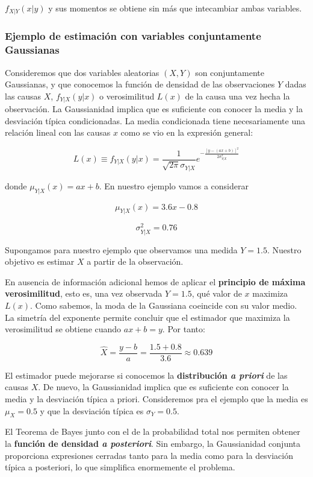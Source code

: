 \documentclass[11pt]{article}
\begin{document}
\(f_{X | Y}(x | y)\) y sus momentos se obtiene sin más que intecambiar
ambas variables.

    \hypertarget{ejemplo-de-estimaciuxf3n-con-variables-conjuntamente-gaussianas}{%
\subsubsection{Ejemplo de estimación con variables conjuntamente
Gaussianas}\label{ejemplo-de-estimaciuxf3n-con-variables-conjuntamente-gaussianas}}

Consideremos que dos variables aleatorias \((X, Y)\) son conjuntamente
Gaussianas, y que conocemos la función de densidad de las observaciones
\(Y\) dadas las causas \(X\), \(f_{Y | X}(y | x)\) o verosimilitud
\(L(x)\) de la causa una vez hecha la observación. La Gaussianidad
implica que es suficiente con conocer la media y la desviación típica
condicionadas. La media condicionada tiene necesariamente una relación
lineal con las causas \(x\) como se vio en la expresión general:

\[
L(x) \equiv f_{Y | X}(y | x)=\frac{1}{\sqrt{2\pi}\sigma_{Y | X}}e^{-\frac{\left[y-(ax+b)\right]^2}{2\sigma_{Y | X}^2}}
\]

donde \(\mu_{Y | X}(x) = ax + b\). En nuestro ejemplo vamos a considerar

\[
\mu_{Y | X}(x) = 3.6x - 0.8
\]

\[
\sigma_{Y | X}^2 = 0.76
\]

Supongamos para nuestro ejemplo que observamos una medida \(Y=1.5\).
Nuestro objetivo es estimar \(X\) a partir de la observación.

    En ausencia de información adicional hemos de aplicar el
\textbf{principio de máxima verosimilitud}, esto es, una vez observada
\(Y=1.5\), qué valor de \(x\) maximiza \(L(x)\). Como sabemos, la moda
de la Gaussiana coeincide con su valor medio. La simetría del exponente
permite concluir que el estimador que maximiza la verosimilitud se
obtiene cuando \(ax+b = y\). Por tanto:

\[
\hat{X} = \frac{y-b}{a} = \frac{1.5+0.8}{3.6} \approx 0.639
\]

El estimador puede mejorarse si conocemos la \textbf{distribución
\emph{a priori}} de las causas \(X\). De nuevo, la Gaussianidad implica
que es suficiente con conocer la media y la desviación típica a priori.
Consideremos pra el ejemplo que la media es \(\mu_X = 0.5\) y que la
desviación típica es \(\sigma_Y=0.5\).

El Teorema de Bayes junto con el de la probabilidad total nos permiten
obtener la \textbf{función de densidad \emph{a posteriori}}. Sin
embargo, la Gaussianidad conjunta proporciona expresiones cerradas tanto
para la media como para la desviación típica a posteriori, lo que
simplifica enormemente el problema.
\end{document}
